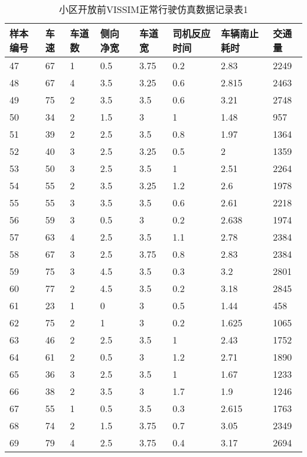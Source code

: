 \begin{table*}[h!]
  \centering
  \small
  \caption{小区开放前VISSIM正常行驶仿真数据记录表1}
  \begin{tabular*}{\linewidth}{p{40pt}<{\centering}p{30pt}<{\centering}
    p{30pt}<{\centering}p{40pt}<{\centering}p{50pt}<{\centering}p{70pt}<{\centering}
    p{60pt}<{\centering}p{50pt}<{\centering}}
    \toprule
    样本编号 &  车速 & 车道数  & 侧向 净宽 &  车道宽  &  司机反应时间  & 车辆南止耗时  &  交通量  \\
    \midrule
    47 & 67 & 1 & 0.5 & 3.75 & 0.2 & 2.83 & 2249 \\
    48 & 67 & 4 & 3.5 & 3.25 & 0.6 & 2.815 & 2463 \\
    49 & 75 & 2 & 3.5 & 3.5 & 0.6 & 3.21 & 2748 \\
    50 & 34 & 2 & 1.5 & 3 & 1 & 1.48 & 957 \\
    51 & 39 & 2 & 2.5 & 3.5 & 0.8 & 1.97 & 1364 \\
    52 & 40 & 3 & 2.5 & 3.25 & 0.5 & 2 & 1359 \\
    53 & 50 & 3 & 2.5 & 3.5 & 1 & 2.51 & 2264 \\
    54 & 55 & 2 & 3.5 & 3.25 & 1.2 & 2.6 & 1978 \\
    55 & 55 & 3 & 3.5 & 3.5 & 0.6 & 2.61 & 2218 \\
    56 & 59 & 3 & 0.5 & 3 & 0.2 & 2.638 & 1974 \\
    57 & 63 & 4 & 2.5 & 3.5 & 1.1 & 2.78 & 2384 \\
    58 & 67 & 3 & 2.5 & 3.75 & 0.8 & 2.83 & 2384 \\
    59 & 75 & 3 & 4.5 & 3.5 & 0.3 & 3.2 & 2801 \\
    60 & 77 & 2 & 4.5 & 3.5 & 0.2 & 3.18 & 2845 \\
    61 & 23 & 1 & 0 & 3 & 0.5 & 1.44 & 458 \\
    62 & 75 & 2 & 1 & 3 & 0.2 & 1.625 & 1065 \\
    63 & 46 & 2 & 2.5 & 3.5 & 1 & 2.43 & 1752 \\
    64 & 61 & 2 & 0.5 & 3 & 1.2 & 2.71 & 1890 \\
    65 & 36 & 3 & 2.5 & 3.5 & 1 & 1.67 & 1233 \\
    66 & 38 & 2 & 3.5 & 3 & 1.7 & 1.9 & 1246 \\
    67 & 55 & 1 & 0.5 & 3.5 & 0.3 & 2.615 & 1763 \\
    68 & 74 & 2 & 1.5 & 3.75 & 0.7 & 3.05 & 2349 \\
    69 & 79 & 4 & 2.5 & 3.75 & 0.4 & 3.17 & 2694 \\

\end{tabular*}
\end{table*}

